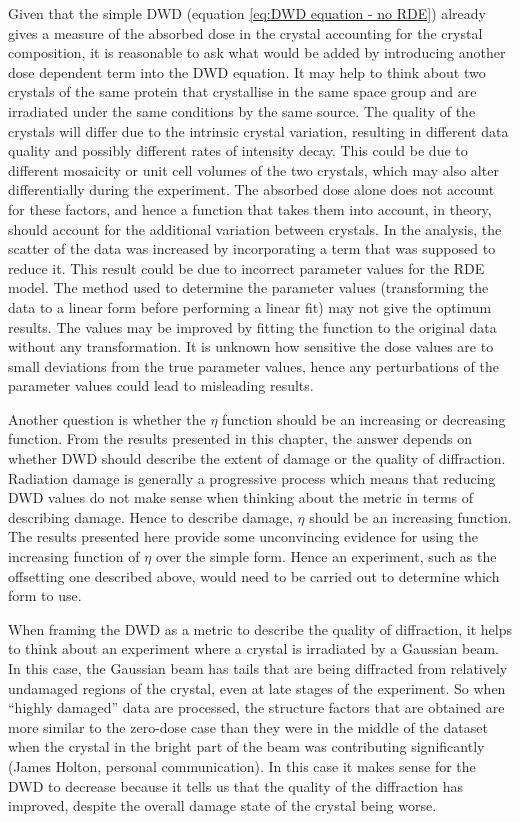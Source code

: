 Given that the simple DWD (equation \ref{eq:DWD equation - no RDE}) already gives a measure of the absorbed dose in the crystal accounting for the crystal composition, it is reasonable to ask what would be added by introducing another dose dependent term into the DWD equation.
It may help to think about two crystals of the same protein that crystallise in the same space group and are irradiated under the same conditions by the same source.
The quality of the crystals will differ due to the intrinsic crystal variation, resulting in different data quality and possibly different rates of intensity decay.
This could be due to different mosaicity or unit cell volumes of the two crystals, which may also alter differentially during the experiment.
The absorbed dose alone does not account for these factors, and hence a function that takes them into account, in theory, should account for the additional variation between crystals.
In the analysis, the scatter of the data was increased by incorporating a term that was supposed to reduce it.
This result could be due to incorrect parameter values for the RDE model.
The method used to determine the parameter values (transforming the data to a linear form before performing a linear fit) may not give the optimum results.
The values may be improved by fitting the function to the original data without any transformation.
It is unknown how sensitive the dose values are to small deviations from the true parameter values, hence any perturbations of the parameter values could lead to misleading results.

Another question is whether the $\eta$ function should be an increasing or decreasing function.
From the results presented in this chapter, the answer depends on whether DWD should describe the extent of damage or the quality of diffraction.
Radiation damage is generally a progressive process which means that reducing DWD values do not make sense when thinking about the metric in terms of describing damage.
Hence to describe damage, $\eta$ should be an increasing function.
The results presented here provide some unconvincing evidence for using the increasing function of $\eta$ over the simple form.
Hence an experiment, such as the offsetting one described above, would need to be carried out to determine which form to use.

When framing the DWD as a metric to describe the quality of diffraction, it helps to think about an experiment where a crystal is irradiated by a Gaussian beam.
In this case, the Gaussian beam has tails that are being diffracted from relatively undamaged regions of the crystal, even at late stages of the experiment.
So when ``highly damaged'' data are processed, the structure factors that are obtained are more similar to the zero-dose case than they were in the middle of the dataset when the crystal in the bright part of the beam was contributing significantly (James Holton, personal communication).
In this case it makes sense for the DWD to decrease because it tells us that the quality of the diffraction has improved, despite the overall damage state of the crystal being worse.

